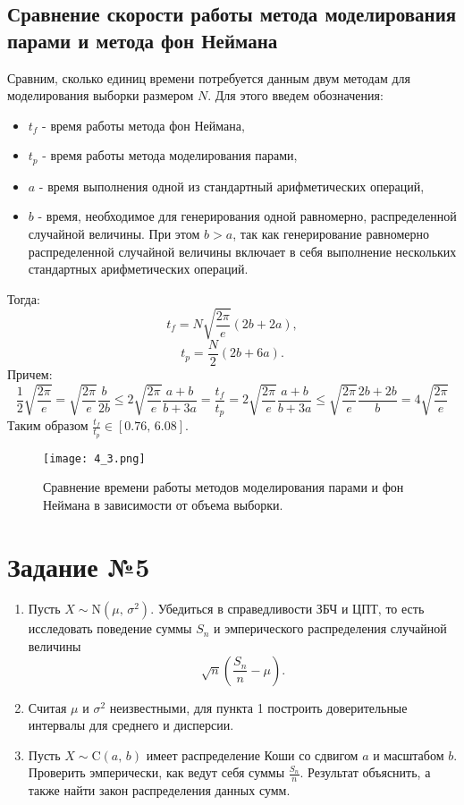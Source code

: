 \documentclass[a4paper, 11pt]{article}
\theoremstyle{def}
\theoremstyle{th}
\theoremstyle{rem}
\begin{document}
\subsection{Сравнение скорости работы метода моделирования парами  и метода фон Неймана}
Сравним, сколько единиц времени потребуется данным двум методам для моделирования выборки размером $N$. Для этого введем обозначения:
\begin{itemize}
    \item $t_f$ - время работы метода фон Неймана,
    \item $t_p$ - время работы метода моделирования парами,
    \item $a$ - время выполнения одной из стандартный арифметических операций,
    \item $b$ - время, необходимое для генерирования одной равномерно, распределенной случайной величины. При этом $b > a$, так как генерирование равномерно распределенной случайной величины включает в себя выполнение нескольких стандартных арифметических операций.
\end{itemize}
Тогда:
$$
t_f = N \sqrt{\frac{2\pi}{e}}(2b + 2a),
$$
$$
t_p = \frac{N}{2}(2b + 6a).
$$
Причем:
$$
  \frac{1}{2}\sqrt{\frac{2\pi}{e}} = \sqrt{\frac{2\pi}{e}} \frac{b}{2b}\leqslant 2\sqrt{\frac{2\pi}{e}}\frac{a+b}{b + 3a} = \frac{t_f}{t_p} = 2\sqrt{\frac{2\pi}{e}}\frac{a+b}{b + 3a} \leqslant \sqrt{\frac{2\pi}{e}} \frac{2b + 2b}{b} = 4 \sqrt{\frac{2\pi}{e}}
$$
Таким образом $\displaystyle \frac{t_f}{t_p} \in [0.76,\, 6.08].$
\begin{figure}[H]
        \centering
        \texttt{[image: 4\_3.png]}
        \caption{Сравнение времени работы методов моделирования парами и фон Неймана в зависимости от объема выборки.}
\end{figure}




\section{Задание №5}

\begin{enumerate}
        \item Пусть $X \sim \mbox{N}(\mu,\,\sigma^2)$. Убедиться в справедливости ЗБЧ и ЦПТ, то есть исследовать поведение суммы $S_n$ и эмперического распределения случайной величины
$$
        \sqrt{n}
        \left(
                \frac{S_n}{n} - \mu
        \right).
$$
        \item Считая $\mu$ и $\sigma^2$ неизвестными, для пункта 1 построить доверительные интервалы для среднего и дисперсии.
        \item Пусть $X \sim \mbox{C}(a,\,b)$ имеет распределение Коши со сдвигом $a$ и масштабом $b$. Проверить эмперически, как ведут себя суммы $\displaystyle \frac{S_n}{n}$. Результат объяснить, а также найти закон распределения данных сумм.
\end{enumerate}
\end{document}
